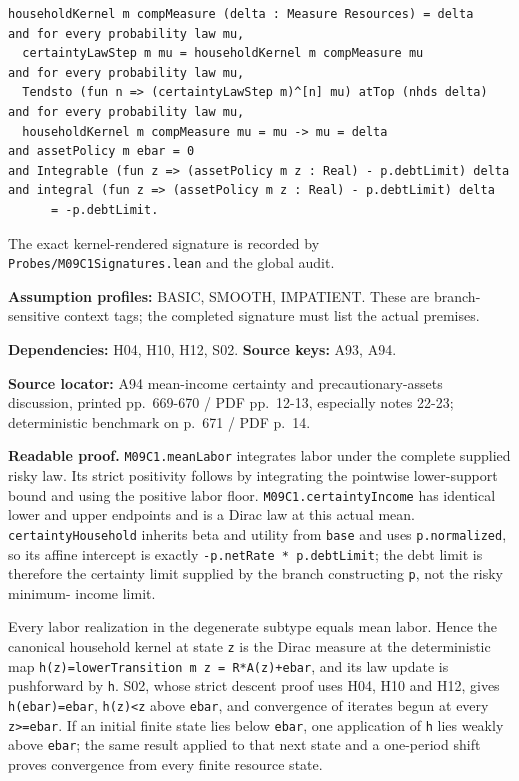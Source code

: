 \documentclass[
  11pt,
]{article}
\let\LedgerOriginalTexttt\texttt
\renewcommand{\texttt}[1]{{\small\LedgerOriginalTexttt{#1}}}
\begin{document}
\begin{verbatim}
householdKernel m compMeasure (delta : Measure Resources) = delta
and for every probability law mu,
  certaintyLawStep m mu = householdKernel m compMeasure mu
and for every probability law mu,
  Tendsto (fun n => (certaintyLawStep m)^[n] mu) atTop (nhds delta)
and for every probability law mu,
  householdKernel m compMeasure mu = mu -> mu = delta
and assetPolicy m ebar = 0
and Integrable (fun z => (assetPolicy m z : Real) - p.debtLimit) delta
and integral (fun z => (assetPolicy m z : Real) - p.debtLimit) delta
      = -p.debtLimit.
\end{verbatim}

The exact kernel-rendered signature is recorded by
\texttt{Probes/M09C1Signatures.lean} and the global audit.

\textbf{Assumption profiles:} BASIC, SMOOTH, IMPATIENT. These are
branch-sensitive context tags; the completed signature must list the
actual premises.

\textbf{Dependencies:} H04, H10, H12, S02. \textbf{Source keys:} A93,
A94.

\textbf{Source locator:} A94 mean-income certainty and
precautionary-assets discussion, printed pp.~669-670 / PDF pp.~12-13,
especially notes 22-23; deterministic benchmark on p.~671 / PDF p.~14.

\textbf{Readable proof.} \texttt{M09C1.meanLabor} integrates labor under
the complete supplied risky law. Its strict positivity follows by
integrating the pointwise lower-support bound and using the positive
labor floor. \texttt{M09C1.certaintyIncome} has identical lower and
upper endpoints and is a Dirac law at this actual mean.
\texttt{certaintyHousehold} inherits beta and utility from \texttt{base}
and uses \texttt{p.normalized}, so its affine intercept is exactly
\texttt{-p.netRate\ *\ p.debtLimit}; the debt limit is therefore the
certainty limit supplied by the branch constructing \texttt{p}, not the
risky minimum- income limit.

Every labor realization in the degenerate subtype equals mean labor.
Hence the canonical household kernel at state \texttt{z} is the Dirac
measure at the deterministic map
\texttt{h(z)=lowerTransition\ m\ z\ =\ R*A(z)+ebar}, and its law update
is pushforward by \texttt{h}. S02, whose strict descent proof uses H04,
H10 and H12, gives \texttt{h(ebar)=ebar}, \texttt{h(z)\textless{}z}
above \texttt{ebar}, and convergence of iterates begun at every
\texttt{z\textgreater{}=ebar}. If an initial finite state lies below
\texttt{ebar}, one application of \texttt{h} lies weakly above
\texttt{ebar}; the same result applied to that next state and a
one-period shift proves convergence from every finite resource state.
\end{document}
